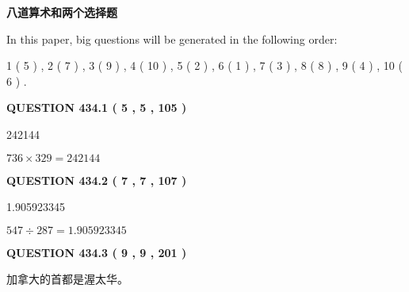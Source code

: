 \documentclass{ctexart}
\begin{document}
   
   
   
 \vspace{0.2in}
{\LARGE {\textbf{ 八道算术和两个选择题}}}
   
   
   
\vspace{0.2in}
   
In this paper, big questions will be generated in the following order: 
   
   
   1 ( 5 )
 ,
   2 ( 7 )
 ,
   3 ( 9 )
 ,
   4 ( 10 )
 ,
   5 ( 2 )
 ,
   6 ( 1 )
 ,
   7 ( 3 )
 ,
   8 ( 8 )
 ,
   9 ( 4 )
 ,
   10 ( 6 )
 .
  
\vspace{0.2in}
  
{\textbf{\Large{QUESTION
434.1 
 ( 5 , 5 , 105 )
}}}
  
  
 
 
\noindent{}

242144
 
 
 
 
\noindent{}

$ %
736 \times  %
329=   %
242144$
 
 
  
\vspace{0.2in}
  
{\textbf{\Large{QUESTION
434.2 
 ( 7 , 7 , 107 )
}}}
  
  
 
 
\noindent{}

1.905923345
 
 
 
 
\noindent{}

$ %
547 \div  %
287=   %
1.905923345$
 
 
  
\vspace{0.2in}
  
{\textbf{\Large{QUESTION
434.3 
 ( 9 , 9 , 201 )
}}}
  
  
 
 
\noindent{}
 
 
加拿大的首都是渥太华。
 
 
 
\end{document}
